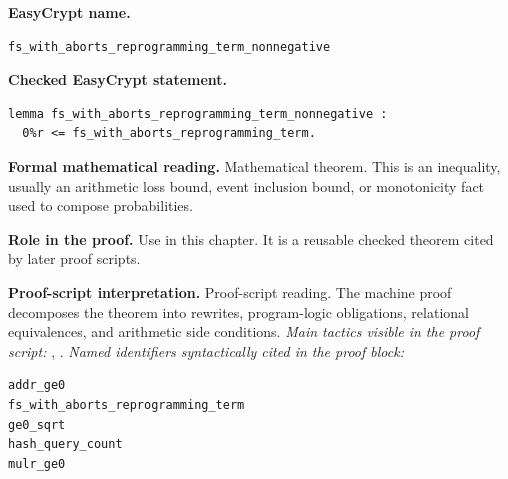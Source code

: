 \begin{formaltheorem}
\noindent\textbf{EasyCrypt name.}
\begin{lstlisting}[language=EasyCrypt,basicstyle=\ttfamily\scriptsize]
fs_with_aborts_reprogramming_term_nonnegative
\end{lstlisting}
\noindent\textbf{Checked EasyCrypt statement.}
\begin{lstlisting}[language=EasyCrypt,basicstyle=\ttfamily\scriptsize]
lemma fs_with_aborts_reprogramming_term_nonnegative :
  0%r <= fs_with_aborts_reprogramming_term.
\end{lstlisting}
\noindent\textbf{Formal mathematical reading.}
Mathematical theorem. This is an inequality, usually an arithmetic loss bound, event inclusion bound, or monotonicity fact used to compose probabilities.

\noindent\textbf{Role in the proof.}
Use in this chapter. It is a reusable checked theorem cited by later proof scripts.

\noindent\textbf{Proof-script interpretation.}
Proof-script reading. The machine proof decomposes the theorem into rewrites, program-logic obligations, relational equivalences, and arithmetic side conditions.
\emph{Main tactics visible in the proof script:} , .
\emph{Named identifiers syntactically cited in the proof block:}
\begin{lstlisting}[language=EasyCrypt,basicstyle=\ttfamily\scriptsize]
addr_ge0
fs_with_aborts_reprogramming_term
ge0_sqrt
hash_query_count
mulr_ge0
\end{lstlisting}

\end{formaltheorem}

